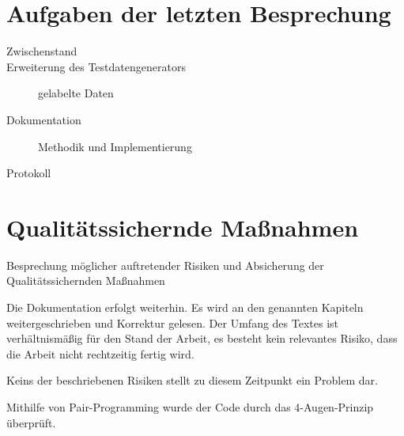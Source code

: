 
\newcommand{\Titel}{7. Protokoll}
\newcommand{\Teilnehmer}{Jonas Bürgel, Markus Reischl, Patrick Welter}
\newcommand{\DatumUndZeit}{07.03.2022 20:00-20:15}
\newcommand{\Ort}{Zoom Meeting}
\newcommand{\Thema}{Erweiterung GAN: Anpassungen zur Qualitätssteigerung}


\section{Aufgaben der letzten Besprechung}
\begin{description}
	\item[Zwischenstand]  \fullcheck
	\item[Erweiterung des Testdatengenerators] gelabelte Daten  \fullcheck
	\item[Dokumentation] Methodik und Implementierung  \halfcheck
	\item[Protokoll]  \fullcheck
\end{description}


\section{Qualitätssichernde Maßnahmen}
Besprechung möglicher auftretender Risiken und Absicherung der Qualitätssichernden Maßnahmen
\begin{description}[style=nextline]
	\item[Review und Dokumentation \hfill \fullcheck]
	Die Dokumentation erfolgt weiterhin.
	Es wird an den genannten Kapiteln weitergeschrieben und Korrektur gelesen.
	Der Umfang des Textes ist verhältnismäßig für den Stand der Arbeit, es besteht kein relevantes Risiko, dass die Arbeit nicht rechtzeitig fertig wird.
	
	\item[Risikoanalyse \hfill \fullcheck]
	Keins der beschriebenen Risiken stellt zu diesem Zeitpunkt ein Problem dar.
	
	\item[Pair-Programming \hfill \fullcheck]
	Mithilfe von Pair-Programming wurde der Code durch das 4-Augen-Prinzip überprüft.
	
	
\end{description}

